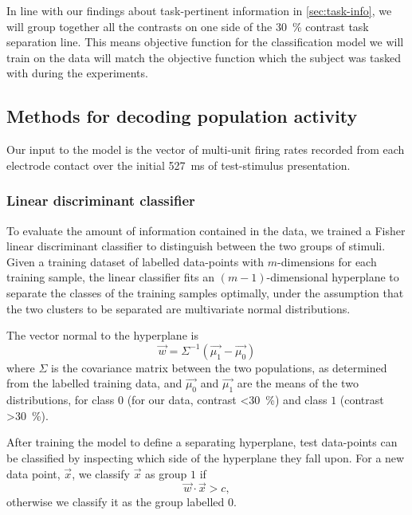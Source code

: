 
In line with our findings about task-pertinent information in \autoref{sec:task-info}, we will group together all the contrasts on one side of the \SI{30}{\percent} contrast task separation line.
This means objective function for the classification model we will train on the data will match the objective function which the subject was tasked with during the experiments.


\subsection{Methods for decoding population activity}

Our input to the model is the vector of multi-unit firing rates recorded from each electrode contact over the initial \SI{527}{\milli\second} of test-stimulus presentation.


\subsubsection{Linear discriminant classifier}

To evaluate the amount of information contained in the data, we trained a Fisher linear discriminant classifier to distinguish between the two groups of stimuli.
Given a training dataset of labelled data-points with $m$-dimensions for each training sample, the linear classifier fits an $(m-1)$-dimensional hyperplane to separate the classes of the training samples optimally, under the assumption that the two clusters to be separated are multivariate normal distributions.

The vector normal to the hyperplane is 
\begin{equation}
\vec{w} = \Sigma^{-1}\left(\vec{\mu_1}-\vec{\mu_0}\right)
\end{equation}
where $\Sigma$ is the covariance matrix between the two populations, as determined from the labelled training data, and $\vec{\mu_0}$ and $\vec{\mu_1}$ are the means of the two distributions, for class $0$ (for our data, contrast \SI{<30}{\percent}) and class $1$ (contrast \SI{>30}{\percent}).

After training the model to define a separating hyperplane, test data-points can be classified by inspecting which side of the hyperplane they fall upon.
For a new data point, $\vec{x}$, we classify $\vec{x}$ as group $1$ if
\begin{equation}
\vec{w}\cdot\vec{x}>c
,\end{equation}
otherwise we classify it as the group labelled $0$.

